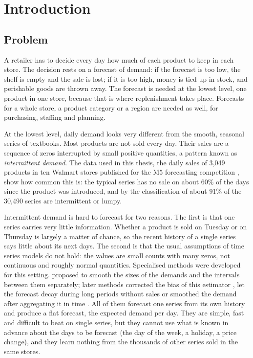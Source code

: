 \chapter{Introduction}
\label{ch:introduction}

\section{Problem}
\label{sec:problem}

A retailer has to decide every day how much of each product to keep in each store. The decision rests on a
forecast of demand: if the forecast is too low, the shelf is empty and the sale is lost; if it is too high,
money is tied up in stock, and perishable goods are thrown away. The forecast is needed at the lowest level,
one product in one store, because that is where replenishment takes place. Forecasts for a whole store, a
product category or a region are needed as well, for purchasing, staffing and planning.

At the lowest level, daily demand looks very different from the smooth, seasonal series of textbooks. Most
products are not sold every day. Their sales are a sequence of zeros interrupted by small positive
quantities, a pattern known as \emph{intermittent demand}. The data used in this thesis, the daily sales of
3{,}049 products in ten Walmart stores published for the M5 forecasting competition
\citep{makridakis2022background}, show how common this is: the typical series has no sale on about 60\% of
the days since the product was introduced, and by the classification of \citet{syntetos2005categorization}
about 91\% of the 30{,}490 series are intermittent or lumpy.

Intermittent demand is hard to forecast for two reasons. The first is that one series carries very little
information. Whether a product is sold on Tuesday or on Thursday is largely a matter of chance, so the
recent history of a single series says little about its next days. The second is that the usual assumptions
of time series models do not hold: the values are small counts with many zeros, not continuous and roughly
normal quantities. Specialised methods were developed for this setting. \citet{croston1972} proposed to
smooth the sizes of the demands and the intervals between them separately; later methods corrected the bias
of this estimator \citep{syntetos2005accuracy}, let the forecast decay during long periods without sales
\citep{teunter2011} or smoothed the demand after aggregating it in time \citep{nikolopoulos2011}. All of
them forecast one series from its own history and produce a flat forecast, the expected demand per day.
They are simple, fast and difficult to beat on single series, but they cannot use what is known in advance
about the days to be forecast (the day of the week, a holiday, a price change), and they learn nothing from
the thousands of other series sold in the same stores.

